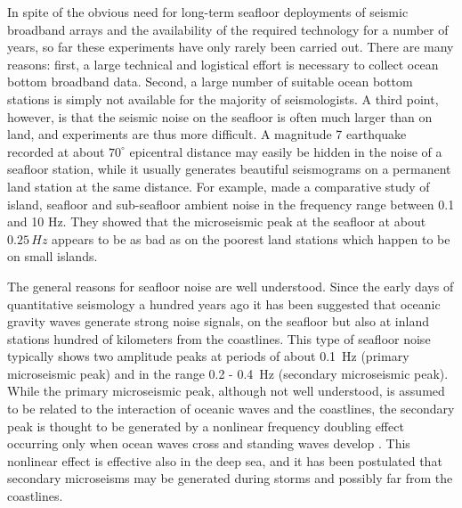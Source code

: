 \documentclass{article}
\begin{document}
{In spite of the obvious need for long-term seafloor 
deployments of seismic broadband arrays and 
the availability of the required technology for a number of years,
 so far these experiments 
have only rarely been carried out.
There are many reasons: 
first, a large technical and logistical effort is necessary 
to collect ocean bottom broadband data. 
Second, a large number of suitable 
ocean bottom stations is simply not available for the majority of 
seismologists.
A third point, however, is that the seismic noise on the seafloor is
often much larger than on land, and experiments are thus more difficult. 
A magnitude 7 earthquake recorded at about $70^{\circ}$ epicentral 
distance may easily be hidden in the noise of a seafloor station,  
while it usually generates beautiful seismograms on a permanent 
land station at the same distance.
For example, \cite{hedlin:89}
made a comparative study of island, seafloor and sub-seafloor ambient noise
in the frequency range between 0.1 and 10 Hz.
They showed that the microseismic peak at the seafloor at about 
$0.25\, Hz$ appears to be 
as bad as on the poorest land stations which happen to be on small islands.

The general reasons for seafloor noise are well understood.
Since the early days of quantitative seismology a hundred years ago 
it has been suggested that oceanic gravity waves generate strong
noise signals,  
on the seafloor but also 
at inland stations hundred of kilometers from the coastlines. 
This type of seafloor noise typically shows two amplitude peaks 
at periods of about 0.1~Hz (primary microseismic peak) and 
in the range 0.2 - 0.4~Hz (secondary microseismic peak).
While the primary microseismic peak,
although not well understood, 
is assumed to 
be related to the interaction of oceanic waves and the coastlines, 
the secondary peak is thought to be generated by a nonlinear 
frequency doubling effect occurring only when ocean waves cross 
and standing waves develop 
\cite[e.g.][]{longuet-higgins:50,hasselmann:63,webb:98,essen:03}.
This nonlinear effect is effective also in the deep sea, 
and it has been postulated that secondary microseisms may be generated 
during storms and possibly far from the coastlines.

}
\end{document}
